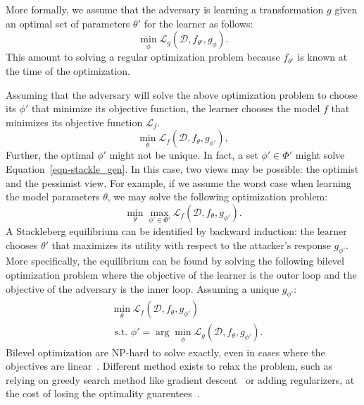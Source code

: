 More formally, we assume that the adversary is learning a transformation $g$ given an optimal set of parameters $\theta'$ for the learner as follows:
\begin{equation}
\label{eqn-stackle_gen}
    \min_\phi \mathcal{L}_g(\mathcal{D}, f_{\theta'}, g_\phi).
\end{equation}
This amount to solving a regular optimization problem because $f_{\theta'}$ is known at the time of the optimization.

Assuming that the adversary will solve the above optimization problem to choose its $\phi'$ that minimize its objective function, the learner chooses the model $f$ that minimizes its objective function $\mathcal{L}_f$.
\[
\min_\theta \mathcal{L}_f(\mathcal{D}, f_\theta, g_{\phi'}),
\]
Further, the optimal $\phi'$ might not be unique. In fact, a set $\phi'\in\Phi'$ might solve Equation~\eqref{eqn-stackle_gen}. In this case, two views may be possible: the optimist and the pessimist view. For example, if we assume the worst case when learning the model parameters $\theta$, we may solve the following optimization problem:
\[
\min_\theta\max_{\phi'\in\Phi'} \mathcal{L}_f(\mathcal{D}, f_\theta, g_{\phi'}).
\]
A Stackleberg equilibrium can be identified by backward induction: the learner chooses $\theta'$ that maximizes its utility with respect to the attacker’s response $g_{\phi'}$. More specifically, the equilibrium can be found by solving the following bilevel optimization problem where the objective of the learner is the outer loop and the objective of the adversary is the inner loop. Assuming a unique $g_{\phi'}$:
\begin{equation}
    \label{eqn-bilevel}
    \begin{split}
        &\min_\theta \mathcal{L}_f(\mathcal{D}, f_\theta, g_{\phi'})\\
        & \text{ s.t. } \phi' = \arg\min_{\phi}\mathcal{L}_g(\mathcal{D}, f_\theta, g_{\phi'}).
    \end{split}
\end{equation}
Bilevel optimization are NP-hard to solve exactly, even in cases where the objectives are linear~\cite{jeroslow_polynomial_bilevel}. Different method exists to relax the problem, such as relying on greedy search method like gradient descent~\cite{naveiro_gradient_stackelberg} or adding regularizers, at the cost of losing the optimality guarentees~\cite{colson_bilevel}.

